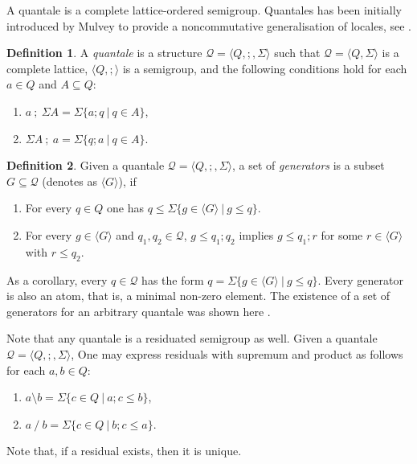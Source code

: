 \documentclass[a4paper]{article}
\theoremstyle{definition}
\newtheorem{definition}{Definition}
\theoremstyle{theorem}
\theoremstyle{proposition}
\theoremstyle{lemma}
\theoremstyle{ex}
\theoremstyle{corollary}
\theoremstyle{claim}
\begin{document}
A quantale is a complete lattice-ordered semigroup. Quantales has been initially introduced by Mulvey to provide a noncommutative generalisation of locales, see \cite{mulvey1986suppl}.

\begin{definition}
  A \emph{quantale} is a structure $\mathcal{Q} = \langle Q, ;, \Sigma \rangle$ such that $\mathcal{Q} = \langle Q, \Sigma \rangle$ is a complete lattice, $\langle Q, ; \rangle$ is a semigroup, and the following conditions hold for each $a \in Q$ and $A \subseteq Q$:
  \begin{enumerate}
    \item $a \: ; \: \Sigma A = \Sigma \{ a ; q \: | \: q \in A \}$,
    \item $\Sigma A \: ; \: a = \Sigma \{ q ; a \: | \: q \in A \}$.
  \end{enumerate}
\end{definition}

\begin{definition}\label{gen}
Given a quantale $\mathcal{Q} = \langle Q, ;, \Sigma \rangle$, a set of \emph{generators} is a subset $G \subseteq \mathcal{Q}$ (denotes as $\langle G \rangle$), if
\begin{enumerate}
  \item For every $q \in Q$ one has $q \leq \Sigma \{ g \in \langle G \rangle \: | \: g \leq q \}$.
  \item For every $g \in \langle G \rangle$ and $q_1, q_2 \in \mathcal{Q}$, $g \leq q_1 ; q_2$ implies $g \leq q_1 ; r$ for some $r \in \langle G \rangle$ with $r \leq q_2$.
\end{enumerate}
\end{definition}

As a corollary, every $q \in \mathcal{Q}$ has the form $q = \Sigma \{ g \in \langle G \rangle \: | \: g \leq q \}$. Every generator is also an atom, that is, a minimal non-zero element. The existence of a set of generators for an arbitrary quantale was shown here \cite[Lemma 3.12]{brown1993representation}.

Note that any quantale is a residuated semigroup as well. Given a quantale $\mathcal{Q} = \langle Q, ;, \Sigma \rangle$, One may express residuals with supremum and product as follows for each $a, b \in Q$:
\begin{enumerate}
  \item $a \setminus b = \Sigma \{ c \in Q \: | \: a ; c \leq b \}$,
  \item $a \: / \: b = \Sigma \{ c \in Q\: | \: b ; c \leq a \}$.
\end{enumerate}
Note that, if a residual exists, then it is unique.
\end{document}
